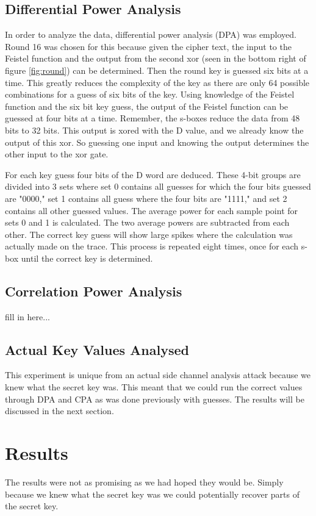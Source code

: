 \subsection{Differential Power Analysis}
	In order to analyze the data, differential power analysis (DPA) was employed.  Round 16 was chosen for this because given the cipher text, the input to the Feistel  function and the output from the second xor (seen in the bottom right of figure \ref{fig:round}) can be determined.  Then the round key is guessed six bits at a time.  This greatly reduces the complexity of the key as there are only 64 possible combinations for a guess of six bits of the key.  Using knowledge of the Feistel function and the six bit key guess, the output of the Feistel function can be guessed at four bits at a time.  Remember, the s-boxes reduce the data from 48 bits to 32 bits.  This output is xored with the D value, and we already know the output of this xor.  So guessing one input and knowing the output determines the other input to the xor gate.  
	
	For each key guess four bits of the D word are deduced.  These 4-bit groups are divided into 3 sets where set 0 contains all guesses for which the four bits guessed are "0000," set 1 contains all guess where the four bits are "1111," and set 2 contains all other guessed values.  The average power for each sample point for sets 0 and 1 is calculated.  The two average powers are subtracted from each other.  The correct key guess will show large spikes where the calculation was actually made on the trace.  This process is repeated eight times, once for each s-box until the correct key is determined.
	
\subsection{Correlation Power Analysis}
fill in here...

\subsection{Actual Key Values Analysed}
  This experiment is unique from an actual side channel analysis attack because we knew what the secret key was.  This meant that we could run the correct values through DPA and CPA as was done previously with guesses.  The results will be discussed in the next section.

\section{Results}\label{res}
  The results were not as promising as we had hoped they would be.  Simply because we knew what the secret key was we could potentially recover parts of the secret key.

